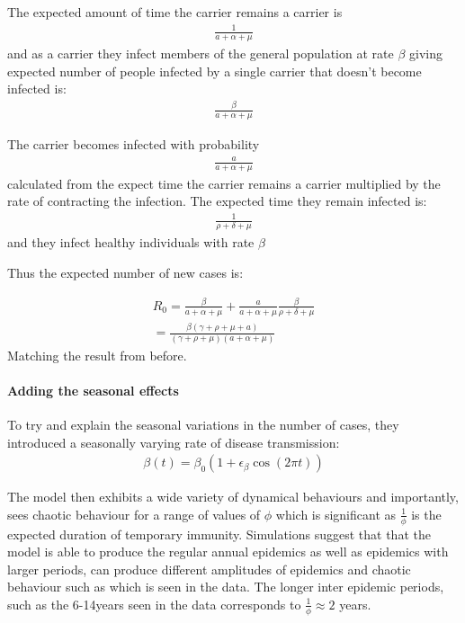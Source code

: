 \documentclass[11pt]{article} %
\begin{document}
The expected amount of time the carrier remains a carrier is
 \begin{eqnarray}
\frac{1}{a+\alpha+\mu}
\end{eqnarray}
and as a carrier they infect members of the general population at rate $ \beta $ giving expected number of people infected by a single carrier that doesn't become infected is:
 \begin{eqnarray}
\frac{\beta}{a+\alpha+\mu}
\end{eqnarray}

The carrier becomes infected with probability 
 \begin{eqnarray}
\frac{a}{a+\alpha+\mu}
\end{eqnarray}
calculated from the expect time the carrier remains a carrier multiplied by the rate of contracting the infection. The expected time they remain infected is: 
 \begin{eqnarray}
\frac{1}{\rho+\delta+\mu }
\end{eqnarray}
and they infect healthy individuals with rate $\beta  $

Thus the expected number of new cases is: 

\begin{eqnarray}
R_0=\frac{\beta}{a+\alpha+\mu}+\frac{a}{a+\alpha+\mu}\frac{\beta}{\rho+\delta+\mu }\\
=\frac{\beta(\gamma+\rho+\mu+a)}{(\gamma+\rho+\mu)(a+\alpha+\mu )}
\end{eqnarray}
Matching the result from before.

\paragraph{Adding the seasonal effects  }


To try and explain the seasonal variations in the number of cases, they introduced a seasonally varying rate of disease transmission:
\begin{eqnarray}
\beta(t)=\beta_0(1+\epsilon_\beta \cos(2\pi t))
\end{eqnarray}
	
The model then exhibits a wide variety of dynamical behaviours and importantly, sees chaotic behaviour for a range of values of $\phi$ which is significant as $\frac{1}{\phi}$ is the expected duration of temporary immunity. Simulations suggest that that the model is able to produce the regular annual epidemics as well as epidemics with larger periods, can produce different amplitudes of epidemics and chaotic behaviour such as which is seen in the data. The longer inter epidemic periods, such as the 6-14years seen in the data corresponds to $\frac{1}{\phi}\approx 2 $ years.  
\end{document}
